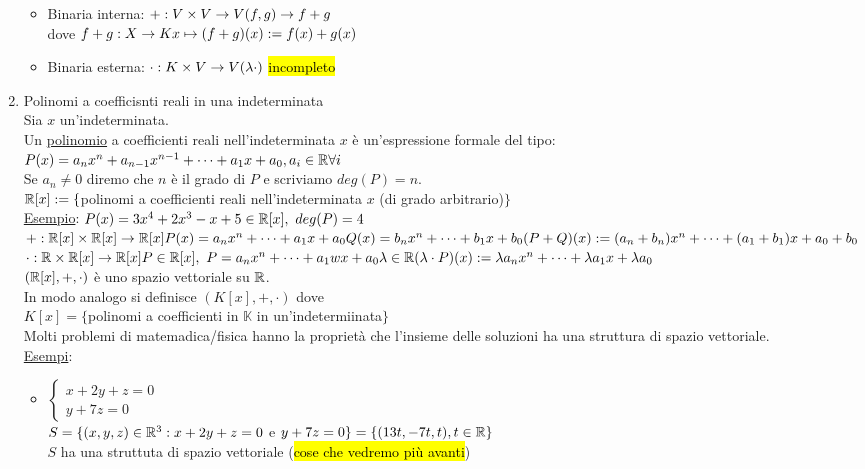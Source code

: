 \documentclass{article}
\begin{document}
\begin{enumerate}
\begin{itemize}
		      \item Binaria interna: $+:V\times V\to V\\(f,g)\to f+g$\\
		            dove $f+g: X\to K\\x\mapsto(f+g)(x):=f(x)+g(x)$
		      \item Binaria esterna: $\cdot:K\times V\to V\\(\lambda\cdot)$ \hl{incompleto}
	      \end{itemize}
	\item Polinomi a coefficisnti reali in una indeterminata\\
	      Sia $x$ un'indeterminata.\\
	      Un \ul{polinomio} a coefficienti reali nell'indeterminata $x$ è un'espressione formale del tipo:\\
	      $P(x)=a_nx^n+a_{n-1}x^{n-1}+\cdots+a_1x+a_0,a_i\in\mathbb{R}\forall i$\\
	      Se $a_n\ne0$ diremo che $n$ è il grado di $P$ e scriviamo $deg(P)=n$.\\
	      $\mathbb{R}[x]:=\{$polinomi a coefficienti reali nell'indeterminata $x$ (di grado arbitrario)$\}$\\
	      \ul{Esempio}: $P(x)=3x^4+2x^3-x+5\in\R[x],\ deg(P)=4$\\
	      $+:\mathbb{R}[x]\times\mathbb{R}[x]\to\mathbb{R}[x]\\P(x)=a_nx^n+\cdots+a_1x+a_0\\Q(x)=b_nx^n+\cdots+b_1x+b_0\\(P+Q)(x):=(a_n+b_n)x^n+\cdots+(a_1+b_1)x+a_0+b_0$\\
	      $\cdot:\R\times\R[x]\to\R[x]\\P\in\R[x],\ P=a_nx^n+\cdots+a_1wx+a_0\\\lambda\in\R\\(\lambda\cdot P)(x):=\lambda a_nx^n+\cdots+\lambda a_1x+\lambda a_0$\\
	      $(\mathbb{R}[x],+,\cdot)$ è uno spazio vettoriale su $\mathbb{R}$.\\
	      In modo analogo si definisce $(K[x],+,\cdot)$ dove\\
	      $K[x]=\{$polinomi a coefficienti in $\mathbb{K}$ in un'indetermiinata$\}$\\
	      Molti problemi di matemadica/fisica hanno la proprietà che l'insieme delle soluzioni ha una struttura di spazio vettoriale.\\
	      \ul{Esempi}:
	      \begin{itemize}
		      \item $\begin{cases}x+2y+z=0\\y+7z=0\end{cases}$\\
		            $S=\{(x,y,z)\in\mathbb{R}^3:x+2y+z=0$ e $y+7z=0\}=\{(13t,-7t,t),t\in\mathbb{R}\}$\\
		            $S$ ha una struttuta di spazio vettoriale (\hl{cose che vedremo più avanti})
	      \end{itemize}
\end{enumerate}
\end{document}
